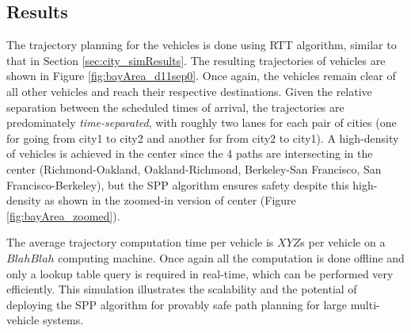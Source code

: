 \subsection{Results \label{sec:bayArea_simResults}}
The trajectory planning for the vehicles is done using RTT algorithm, similar to that in Section \ref{sec:city_simResults}. The resulting trajectories of vehicles are shown in Figure \ref{fig:bayArea_d11sep0}. Once again, the vehicles remain clear of all other vehicles and reach their respective destinations. Given the relative separation between the scheduled times of arrival, the trajectories are predominately \textit{time-separated}, with roughly two lanes for each pair of cities (one for going from city1 to city2 and another for from city2 to city1). A high-density of vehicles is achieved in the center since the 4 paths are intersecting in the center (Richmond-Oakland, Oakland-Richmond, Berkeley-San Francisco, San Francisco-Berkeley), but the SPP algorithm ensures safety despite this high-density as shown in the zoomed-in version of center (Figure \ref{fig:bayArea_zoomed}).  

The average trajectory computation time per vehicle is $XYZ$s per vehicle on a $Blah Blah$ computing machine. Once again all the computation is done offline and only a lookup table query is required in real-time, which can be performed very efficiently. This simulation illustrates the scalability and the potential of deploying the SPP algorithm for provably safe path planning for large multi-vehicle systems.     